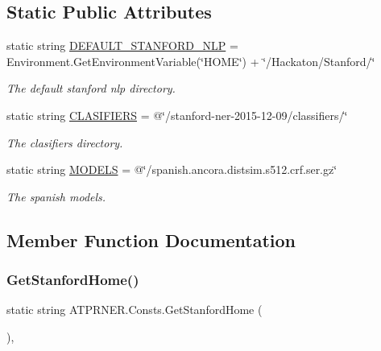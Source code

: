 \subsection*{Static Public Attributes}
\begin{DoxyCompactItemize}
\item 
static string \hyperlink{class_a_t_p_r_n_e_r_1_1_consts_a5552c464404a06a1cb4903e9e8a6fd19}{D\+E\+F\+A\+U\+L\+T\+\_\+\+S\+T\+A\+N\+F\+O\+R\+D\+\_\+\+N\+LP} = Environment.\+Get\+Environment\+Variable(\char`\"{}H\+O\+ME\char`\"{}) + \char`\"{}/Hackaton/Stanford/\char`\"{}
\begin{DoxyCompactList}\small\item\em The default stanford nlp directory. \end{DoxyCompactList}\item 
static string \hyperlink{class_a_t_p_r_n_e_r_1_1_consts_a2c6cdaf05bd4a84d141e3cdd19205f4d}{C\+L\+A\+S\+I\+F\+I\+E\+RS} = @\char`\"{}/stanford-\/ner-\/2015-\/12-\/09/classifiers/\char`\"{}
\begin{DoxyCompactList}\small\item\em The clasifiers directory. \end{DoxyCompactList}\item 
static string \hyperlink{class_a_t_p_r_n_e_r_1_1_consts_a2e80ccd5f9a0b20cf5ce31386604a3b2}{M\+O\+D\+E\+LS} = @\char`\"{}/spanish.\+ancora.\+distsim.\+s512.\+crf.\+ser.\+gz\char`\"{}
\begin{DoxyCompactList}\small\item\em The spanish models. \end{DoxyCompactList}\end{DoxyCompactItemize}


\subsection{Member Function Documentation}
\hypertarget{class_a_t_p_r_n_e_r_1_1_consts_ad399f9a954d0d35c77fdc899f1c47255}{}\label{class_a_t_p_r_n_e_r_1_1_consts_ad399f9a954d0d35c77fdc899f1c47255} 
\subsubsection{\texorpdfstring{Get\+Stanford\+Home()}{GetStanfordHome()}}
{\footnotesize\ttfamily static string A\+T\+P\+R\+N\+E\+R.\+Consts.\+Get\+Stanford\+Home (\begin{DoxyParamCaption}{ }\end{DoxyParamCaption})\hspace{0.3cm}{\ttfamily [inline]}, {\ttfamily [static]}}



